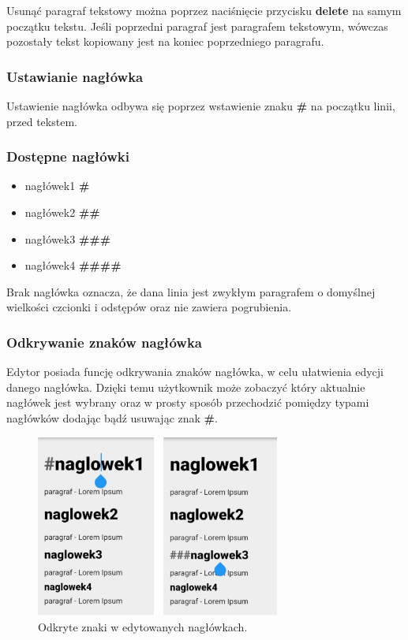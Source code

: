 Usunąć paragraf tekstowy można poprzez naciśnięcie przycisku \textbf{delete} na samym początku tekstu. Jeśli poprzedni paragraf jest paragrafem tekstowym, wówczas pozostały tekst kopiowany jest na koniec poprzedniego paragrafu.

\subsubsection{Ustawianie nagłówka}

Ustawienie nagłówka odbywa się poprzez wstawienie znaku \textbf{\#} na początku linii, przed tekstem.

\subsubsection{Dostępne nagłówki}
\begin{itemize}
    \setlength\itemsep{0mm}
    \item nagłówek1 \textbf{\#}
    \item nagłówek2 \textbf{\#\#}
    \item nagłówek3 \textbf{\#\#\#}
    \item nagłówek4 \textbf{\#\#\#\#}
\end{itemize}

Brak nagłówka oznacza, że dana linia jest zwykłym paragrafem o domyślnej wielkości czcionki i odstępów oraz nie zawiera pogrubienia.

\pagebreak

\subsubsection{Odkrywanie znaków nagłówka}

Edytor posiada funcję odkrywania znaków nagłówka, w celu ułatwienia edycji danego nagłówka. Dzięki temu użytkownik może zobaczyć który aktualnie nagłówek jest wybrany oraz w prosty sposób przechodzić pomiędzy typami nagłówków dodając bądź usuwając znak \textbf{\#}.


\begin{figure}[ht]
    \centering
    \includegraphics[height=6cm]{images/pokazywanie_naglowkow.png}
    \caption{Odkryte znaki w edytowanych nagłówkach.}
\end{figure}

